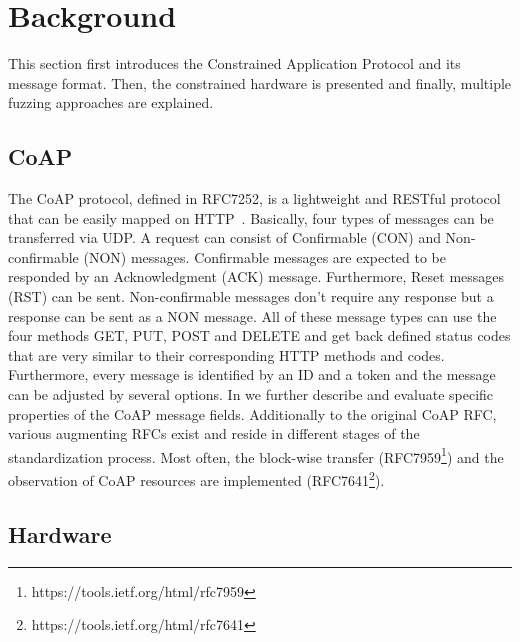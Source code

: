 \section{Background}
\label{section:background}

This section first introduces the Constrained Application Protocol and its message format. Then, the constrained hardware is presented and finally, multiple fuzzing approaches are explained.

\subsection{CoAP}

The CoAP protocol, defined in RFC7252, is a lightweight and RESTful protocol that can be easily mapped on HTTP~\cite{RFC7252}. Basically, four types of messages can be transferred via UDP. A request can consist of Confirmable (CON) and Non-confirmable (NON) messages. Confirmable messages are expected to be responded by an Acknowledgment (ACK) message. Furthermore, Reset messages (RST) can be sent. Non-confirmable messages don't require any response but a response can be sent as a NON message. All of these message types can use the four methods GET, PUT, POST and DELETE and get back defined status codes that are very similar to their corresponding HTTP methods and codes. Furthermore, every message is identified by an ID and a token and the message can be adjusted by several options. In  we further describe and evaluate specific properties of the CoAP message fields.
Additionally to the original CoAP RFC, various augmenting RFCs exist and reside in different stages of the standardization process. Most often, the block-wise transfer (RFC7959\footnote{https://tools.ietf.org/html/rfc7959}) and the observation of CoAP resources are implemented (RFC7641\footnote{https://tools.ietf.org/html/rfc7641}).

\subsection{Hardware}

